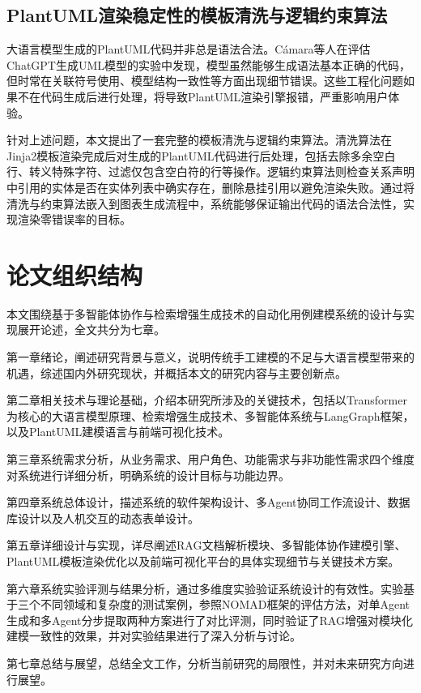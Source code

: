 \subsection{PlantUML渲染稳定性的模板清洗与逻辑约束算法}

大语言模型生成的PlantUML代码并非总是语法合法。Cámara等人\cite{camara2023assessment}在评估ChatGPT生成UML模型的实验中发现，模型虽然能够生成语法基本正确的代码，但时常在关联符号使用、模型结构一致性等方面出现细节错误。这些工程化问题如果不在代码生成后进行处理，将导致PlantUML渲染引擎报错，严重影响用户体验。

针对上述问题，本文提出了一套完整的模板清洗与逻辑约束算法。清洗算法在Jinja2模板渲染完成后对生成的PlantUML代码进行后处理，包括去除多余空白行、转义特殊字符、过滤仅包含空白符的行等操作。逻辑约束算法则检查关系声明中引用的实体是否在实体列表中确实存在，删除悬挂引用以避免渲染失败。通过将清洗与约束算法嵌入到图表生成流程中，系统能够保证输出代码的语法合法性，实现渲染零错误率的目标。

\section{论文组织结构}

本文围绕基于多智能体协作与检索增强生成技术的自动化用例建模系统的设计与实现展开论述，全文共分为七章。

第一章绪论，阐述研究背景与意义，说明传统手工建模的不足与大语言模型带来的机遇，综述国内外研究现状，并概括本文的研究内容与主要创新点。

第二章相关技术与理论基础，介绍本研究所涉及的关键技术，包括以Transformer为核心的大语言模型原理、检索增强生成技术、多智能体系统与LangGraph框架，以及PlantUML建模语言与前端可视化技术。

第三章系统需求分析，从业务需求、用户角色、功能需求与非功能性需求四个维度对系统进行详细分析，明确系统的设计目标与功能边界。

第四章系统总体设计，描述系统的软件架构设计、多Agent协同工作流设计、数据库设计以及人机交互的动态表单设计。

第五章详细设计与实现，详尽阐述RAG文档解析模块、多智能体协作建模引擎、PlantUML模板渲染优化以及前端可视化平台的具体实现细节与关键技术方案。

第六章系统实验评测与结果分析，通过多维度实验验证系统设计的有效性。实验基于三个不同领域和复杂度的测试案例，参照NOMAD框架的评估方法，对单Agent生成和多Agent分步提取两种方案进行了对比评测，同时验证了RAG增强对模块化建模一致性的效果，并对实验结果进行了深入分析与讨论。

第七章总结与展望，总结全文工作，分析当前研究的局限性，并对未来研究方向进行展望。

